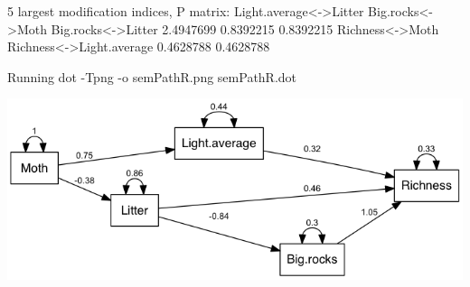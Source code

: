 \documentclass[12pt]{article}
\begin{document}
\begin{Schunk}
\begin{Soutput}
  5 largest modification indices, P matrix:
  Light.average<->Litter         Big.rocks<->Moth       Big.rocks<->Litter 
               2.4947699                0.8392215                0.8392215 
         Richness<->Moth Richness<->Light.average 
               0.4628788                0.4628788 
\end{Soutput}
\begin{Soutput}
Running  dot -Tpng -o semPathR.png  semPathR.dot 
\end{Soutput}
\end{Schunk}

\includegraphics{semPathR.png}

\pagebreak
\end{document}

